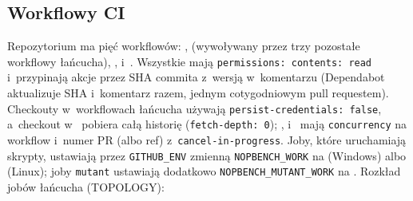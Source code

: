\subsection{Workflowy CI}\label{sec:bench-ci}

Repozytorium ma pięć workflowów: ,  (wywoływany
przez trzy pozostałe workflowy łańcucha), , 
i~. Wszystkie mają \texttt{permissions: contents: read}
i~przypinają akcje przez SHA commita z~wersją w~komentarzu (Dependabot aktualizuje SHA
i~komentarz razem, jednym cotygodniowym pull requestem). Checkouty w~workflowach łańcucha
używają \texttt{persist-credentials: false}, a~checkout w~ pobiera
całą historię (\texttt{fetch-depth: 0}); , 
i~ mają \texttt{concurrency} na workflow i~numer PR (albo ref)
z~\texttt{cancel-in-progress}. Joby, które uruchamiają skrypty, ustawiają przez
\texttt{GITHUB\_ENV} zmienną \texttt{NOPBENCH\_WORK} na 
(Windows) albo  (Linux); joby \texttt{mutant} ustawiają
dodatkowo \texttt{NOPBENCH\_MUTANT\_WORK} na .
Rozkład jobów łańcucha (TOPOLOGY):

